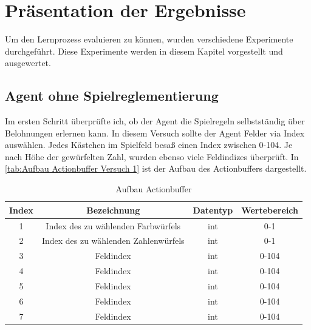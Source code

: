

\clearpage
\chapter{Präsentation der Ergebnisse}

Um den Lernprozess evaluieren zu können, wurden verschiedene Experimente durchgeführt. Diese Experimente werden in diesem Kapitel vorgestellt und ausgewertet.

\section{Agent ohne Spielreglementierung}

Im ersten Schritt überprüfte ich, ob der Agent die Spielregeln selbstständig über Belohnungen erlernen kann. In diesem Versuch sollte der Agent Felder via Index auswählen.
Jedes Kästchen im Spielfeld besaß einen Index zwischen 0-104. Je nach Höhe der gewürfelten Zahl, wurden ebenso viele Feldindizes überprüft. In \ref{tab:Aufbau Actionbuffer Versuch 1} ist der Aufbau des Actionbuffers dargestellt. 

\begin{table}[!h]
    \centering
    \begin{tabular}{|c|c|c|c|}
    \hline
    \textbf{Index} & \textbf{Bezeichnung} & \textbf{Datentyp} & \textbf{Wertebereich} \\
    \hline
    1 & Index des zu wählenden Farbwürfels & int & 0-1 \\
    \hline
    2 & Index des zu wählenden Zahlenwürfels & int & 0-1 \\
    \hline
    3 & Feldindex & int & 0-104 \\
    \hline
    4 & Feldindex & int & 0-104 \\
    \hline
    5 & Feldindex & int & 0-104 \\
    \hline
    6 & Feldindex & int & 0-104 \\
    \hline
    7 & Feldindex & int & 0-104 \\
    \hline
    \end{tabular}
    \caption{Aufbau Actionbuffer}
    \label{tab:Anpassung Actionbuffer Versuch Agent ohne Spielimplementierung}
\end{table}


